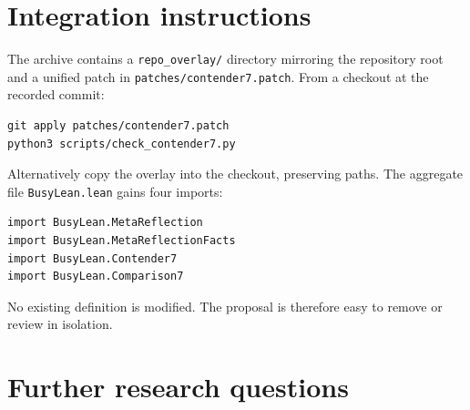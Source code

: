 \documentclass[11pt]{article}
\theoremstyle{definition}
\theoremstyle{remark}
\newcommand{\codepath}[1]{\texttt{#1}}
\begin{document}
\section{Integration instructions}
\label{sec:integration}

The archive contains a \codepath{repo\_overlay/} directory mirroring the
repository root and a unified patch in
\codepath{patches/contender7.patch}.  From a checkout at the recorded commit:
\begin{lstlisting}[language={}]
git apply patches/contender7.patch
python3 scripts/check_contender7.py
\end{lstlisting}
Alternatively copy the overlay into the checkout, preserving paths.  The
aggregate file \codepath{BusyLean.lean} gains four imports:
\begin{lstlisting}
import BusyLean.MetaReflection
import BusyLean.MetaReflectionFacts
import BusyLean.Contender7
import BusyLean.Comparison7
\end{lstlisting}
No existing definition is modified.  The proposal is therefore easy to remove
or review in isolation.

\section{Further research questions}
\label{sec:further}
\end{document}
